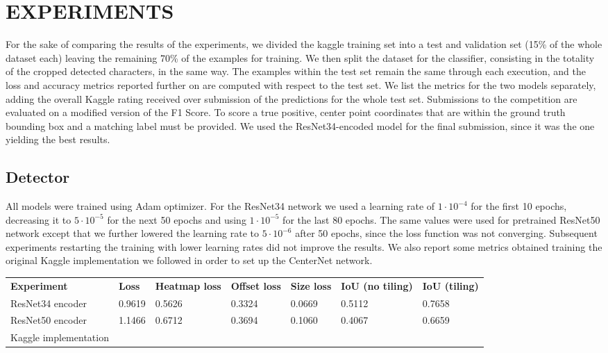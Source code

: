 \section{EXPERIMENTS}
\label{sec:experiments}

For the sake of comparing the results of the experiments, we divided the kaggle training set into a test and validation set (15\% of the whole dataset each) leaving the remaining 70\% of the examples for training. We then split the dataset for the classifier, consisting in the totality of the cropped detected characters, in the same way. The examples within the test set remain the same through each execution, and the loss and accuracy metrics reported further on are computed with respect to the test set. We list the metrics for the two models separately, adding the overall Kaggle rating received over submission of the predictions for the whole test set. Submissions to the competition are evaluated on a modified version of the F1 Score. To score a true positive, center point coordinates that are within the ground truth bounding box and a matching label must be provided. We used the ResNet34-encoded model for the final submission, since it was the one yielding the best results.

\subsection{Detector}
\label{ssec:detectorexp}

All models were trained using Adam optimizer. For the ResNet34 network we used a learning rate of $1 \cdot 10^{-4}$ for the first 10 epochs, decreasing it to $5 \cdot 10^{-5}$ for the next 50 epochs and using $1 \cdot 10^{-5}$ for the last 80 epochs. The same values were used for pretrained ResNet50 network except that we further lowered the learning rate to $5 \cdot 10^{-6}$ after 50 epochs, since the loss function was not converging. Subsequent experiments restarting the training with lower learning rates did not improve the results. We also report some metrics obtained training the original Kaggle implementation we followed in order to set up the CenterNet network.

\begin{table}[h]
	\begin{tabular}{lllllll}
		\rowcolor[HTML]{EFEFEF} 
		\textbf{Experiment}   & \textbf{Loss} & \textbf{Heatmap loss} & \textbf{Offset loss} & \textbf{Size loss} & \textbf{IoU (no tiling)} & \textbf{IoU (tiling)} \\
		ResNet34 encoder      & 0.9619        & 0.5626                & 0.3324               & 0.0669             & 0.5112                   & 0.7658                \\
		ResNet50 encoder      & 1.1466        & 0.6712                & 0.3694               & 0.1060             & 0.4067                   & 0.6659                \\
		Kaggle implementation &               &                       &                      &                    &                          &                      
	\end{tabular}
\end{table}

